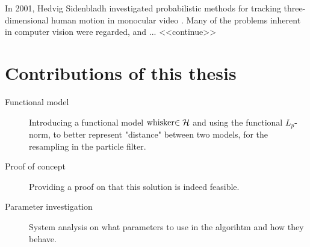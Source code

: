 In 2001, Hedvig Sidenbladh investigated probabilistic methods for tracking three-dimensional human motion in monocular video \cite{Hedvig}. 
Many of the problems inherent in computer vision were regarded, and ... <<continue>>

\section{Contributions of this thesis}

\begin{description}
    \item[Functional model] 
        Introducing a functional model $\text{whisker}{\in{\ensuremath{\mathcal{H}}}}$ and using the functional $L_p$-norm, 
        to better represent "distance" between two models, 
        for the resampling in the particle filter.
    \item[Proof of concept]
        Providing a proof on that this solution is indeed feasible.
    \item[Parameter investigation]
        System analysis on what parameters to use in the algorihtm and how they behave.

\end{description}



